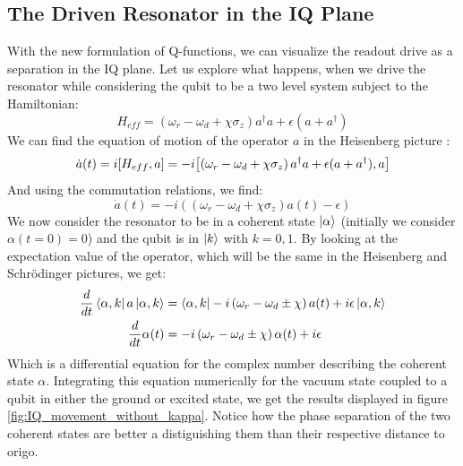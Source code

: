 \subsection{The Driven Resonator in the IQ Plane}\label{sec:driving_resonator_iq_plane}
With the new formulation of Q-functions, we can visualize the readout drive as a separation in the IQ plane. Let us explore what happens, when we drive the resonator while considering the qubit to be a two level system subject to the Hamiltonian:
\begin{equation}
    H_{eff} =  \left(\omega_r - \omega_d + \chi \sigma_z\right)a^\dagger a +\epsilon(a + a^\dagger)
\end{equation}
We can find the equation of motion of the operator $a$ in the Heisenberg picture \cite{sakurai_modern_2021}:
\begin{equation}
    \dot{a}(t) = i\comm{H_{eff}}{a} = -i\comm{\left(\omega_r - \omega_d + \chi \sigma_z\right)a^\dagger a + \epsilon(a + a^\dagger)}{a}
\end{equation}
And using the commutation relations, we find:
\begin{equation}
    \dot{a}(t) = -i \left(\left(\omega_r - \omega_d + \chi \sigma_z\right) a(t) - \epsilon\right)
\end{equation}
We now consider the resonator to be in a coherent state $\ket{\alpha}$ (initially we consider $\alpha(t=0) = 0$) and the qubit is in $\ket{k}$ with $k = 0,  1$. By looking at the expectation value of the operator, which will be the same in the Heisenberg and Schrödinger pictures, we get: %
\begin{align}
    \dfrac{d}{dt} \bra{\alpha, k} a \ket{\alpha, k} &= \bra{\alpha, k}- i  \left(\omega_r - \omega_d \pm \chi \right) a(t) + i\epsilon\ket{\alpha, k} \nonumber \\
    \dfrac{d}{dt} \alpha(t) &= - i  \left(\omega_r - \omega_d \pm \chi \right) \alpha(t) + i\epsilon \label{eq:resonator_movement}
\end{align}
Which is a differential equation for the complex number describing the coherent state $\alpha$. Integrating this equation numerically for the vacuum state coupled to a qubit in either the ground or excited state, we get the results displayed in figure \ref{fig:IQ_movement_without_kappa}. Notice how the phase separation of the two coherent states are better a distiguishing them than their respective distance to origo. 



